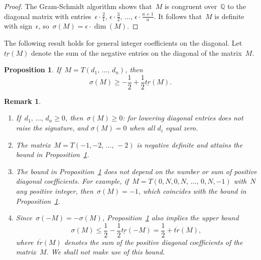 \documentclass[10pt,a4paper]{amsart}
\numberwithin{equation}{section}
\newcommand{\bbQ}{\mathbb{Q}}
\newtheorem{prop}[theo]{Proposition}
\newtheorem{rema}[theo]{Remark}
\begin{document}
\begin{proof}
The Gram-Schmidt algorithm shows that~$M$ is congruent over~$\bbQ$ to the diagonal matrix with entries~$\epsilon \cdot \frac{2}{1}$, $\epsilon \cdot \frac{3}{2}$, $\dots$, $\epsilon \cdot \frac{a+1}{a}$. It follows that~$M$ is definite with sign~$\epsilon$, so~$\sigma(M) = \epsilon \cdot \dim(M)$.
\end{proof}


The following result holds for general integer coefficients on the diagonal. Let~$\underline{tr}(M)$ denote the sum of the negative entries on the diagonal of the matrix~$M$.

\begin{prop}\label{diagonal_sum_prop}
If~$M = T(d_1,\,\dots,\,d_n)$, then
\[
\sigma(M) \ge -\frac{1}{2} + \frac{1}{2} \underline{tr}(M).
\]
\end{prop}

\begin{rema}\label{diagonal_sum_remark}\leavevmode
\begin{enumerate}
\item\label{rema3.3.1} If~$d_1,\,\dots,\,d_n \ge 0$, then~$\sigma(M) \ge 0$: for lowering diagonal entries does not raise the signature, and $\sigma(M)=0$ when all $d_i$ equal zero.
\item\label{rema3.3.2} The matrix~$M = T(-1,-2,\,\dots,\,-2)$ is negative definite and attains the bound in Proposition~\ref{diagonal_sum_prop}.
\item\label{rema3.3.3} The bound in Proposition~\ref{diagonal_sum_prop} does not depend on the number or sum of positive diagonal coefficients. For example, if~$M = T(0,N,0,N,\,\dots,\,0,N,-1)$ with~$N$ any positive integer, then~$\sigma(M) = -1$, which coincides with the bound in Proposition~\ref{diagonal_sum_prop}.
\item\label{rema3.3.4} Since~$\sigma(-M) = - \sigma(M)$, Proposition~\ref{diagonal_sum_prop} also implies the upper bound
\[
\sigma(M) \le \frac{1}{2} - \frac{1}{2} \underline{tr}(-M)= \frac{1}{2} + \overline{tr}(M),
\]
where~$\overline{tr}(M)$ denotes the sum of the positive diagonal coefficients of the matrix~$M$. We shall not make use of this bound.
\end{enumerate}
\end{rema}
\end{document}
